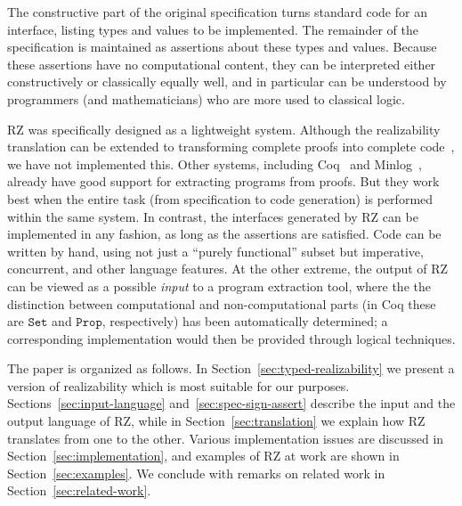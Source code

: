 The constructive part of the original specification turns standard code for
an interface,
listing types and values to be implemented. The remainder of
the specification is maintained as assertions about these types and values.
Because these assertions have no computational content, they can be interpreted
either constructively or classically equally well, and in particular can
be understood by programmers (and mathematicians) who are more used to
classical logic.


RZ was specifically designed as a lightweight system. Although the
realizability translation can be extended to transforming complete
proofs into complete code~\cite{komagata+:tr95}, we have not
implemented this. Other systems, including Coq~\cite{coqart} and
Minlog~\cite{benl98:_proof_theor_work}, already have good support for
extracting programs from proofs. But they work best when the entire
task (from specification to code generation) is performed within the
same system. In contrast, the interfaces generated by RZ can be
implemented in any fashion, as long as the assertions are satisfied.
Code can be written by hand, using not just a ``purely functional'' subset
but imperative, concurrent, and other language features. At the other
extreme, the output of RZ can be viewed as a possible \emph{input} to
a program extraction tool, where the the distinction between
computational and non-computational parts (in Coq these are
$\mathtt{Set}$ and $\mathtt{Prop}$, respectively) has been
automatically determined; a corresponding implementation would then be
provided through logical techniques.


The paper is organized as follows. In
Section~\ref{sec:typed-realizability} we present a version of
realizability which is most suitable for our purposes.
Sections~\ref{sec:input-language} and~\ref{sec:spec-sign-assert}
describe the input and the output language of RZ, while in
Section~\ref{sec:translation} we explain how RZ translates from one to
the other. Various implementation issues are discussed in
Section~\ref{sec:implementation}, and examples of RZ at work are shown
in Section~\ref{sec:examples}. We conclude with remarks on related
work in Section~\ref{sec:related-work}.


